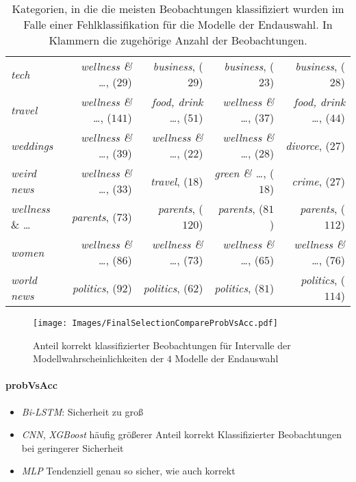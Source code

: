 \documentclass[a4paper,11pt]{article}
\begin{document}
\begin{table}[ht]
\begin{tabular}{|l||rrrr|}
  \textit{tech} & \textit{wellness \& \dots}, ($29$) & \textit{business}, ($29$) & \textit{business}, ($23$) & \textit{business}, ($28$) \\ 
  \textit{travel} & \textit{wellness \& \dots}, ($141$) & \textit{food, drink \dots}, ($51$) & \textit{wellness \& \dots}, ($37$) & \textit{food, \textit{drink} \dots}, ($44$) \\ 
  \textit{weddings} & \textit{wellness \& \dots}, ($39$) & \textit{wellness \& \dots}, ($22$) & \textit{wellness \& \dots}, ($28$) & \textit{divorce}, ($27$) \\ 
  \textit{weird news} & \textit{wellness \& \dots}, ($33$) & \textit{travel}, ($18$) & \textit{green \& \dots}, ($18$) & \textit{crime}, ($27$) \\ 
  \textit{wellness} \& \dots & \textit{parents}, ($73$) & \textit{parents}, ($120$) & \textit{parents}, ($81$) & \textit{parents}, ($112$) \\ 
  \textit{women} & \textit{wellness \& \dots}, ($86$) & \textit{wellness \& \dots}, ($73$) & \textit{wellness \& \dots}, ($65$) & \textit{wellness \& \dots}, ($76$) \\ 
  \textit{world news} & \textit{politics}, ($92$) & \textit{politics}, ($62$) & \textit{politics}, ($81$) & \textit{politics}, ($114$) \\ 
   \hline
\end{tabular}
\caption{Kategorien, in die die meisten Beobachtungen klassifiziert wurden im Falle einer Fehlklassifikation für die Modelle der Endauswahl. In Klammern die zugehörige Anzahl der Beobachtungen.}
\label{tab:neighborClasses}
\end{table}







\begin{figure}[ht]
    \centering
\texttt{[image: Images/FinalSelectionCompareProbVsAcc.pdf]} 
\caption{Anteil korrekt klassifizierter Beobachtungen für Intervalle der Modellwahrscheinlichkeiten der $4$ Modelle der Endauswahl}
\label{abb:CompareProbVsAcc}
\end{figure}


\paragraph{probVsAcc}
\begin{itemize}
    \item \textit{Bi-LSTM}: Sicherheit zu groß
    \item \textit{CNN}, \textit{XGBoost} häufig größerer Anteil korrekt Klassifizierter Beobachtungen bei geringerer Sicherheit
    \item \textit{MLP} Tendenziell genau so sicher, wie auch korrekt
\end{itemize}{}
\end{document}
